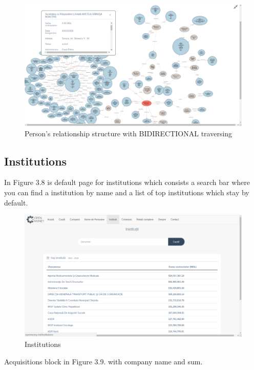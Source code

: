 \documentclass[12pt,a4paper,titlepage]{article}
\begin{document}
	\begin{figure}[!ht] 
	\renewcommand\thefigure{3.7} %
	\centering 
	\includegraphics[width=17cm]{person_graph.png} 
	\caption{ Person's relationship structure with BIDIRECTIONAL traversing }\label{fig4} 
	\end{figure}
	
	\newpage
\subsection{Institutions}

In Figure 3.8 is default page for institutions which consists a search bar where you can find a institution by name and a list of top institutions which stay by default. 

	\begin{figure}[!ht] 
	\renewcommand\thefigure{3.8} %
	\centering 
	\includegraphics[width=17cm]{institutions.png} 
	\caption{ Institutions }\label{fig4} 
	\end{figure}
	
Acquisitions block in Figure 3.9. with company name and sum.
\end{document}
